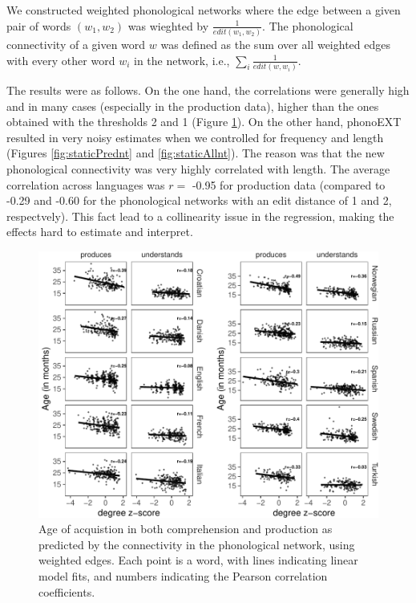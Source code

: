 \documentclass[english,,man,floatsintext]{apa6}
\begin{document}
We constructed weighted phonological networks where the edge between a given pair of words \((w_1, w_2)\) was wieghted by \(\frac{1}{edit(w_1,w_2)}\). The phonological connectivity of a given word \(w\) was defined as the sum over all weighted edges with every other word \(w_i\) in the network, i.e., \(\sum_{i} \frac{1}{edit(w,w_i)}\).

The results were as follows. On the one hand, the correlations were generally high and in many cases (especially in the production data), higher than the ones obtained with the thresholds 2 and 1 (Figure \ref{fig:corrPlotnt}). On the other hand, phonoEXT resulted in very noisy estimates when we controlled for frequency and length (Figures \ref{fig:staticPrednt} and \ref{fig:staticAllnt}). The reason was that the new phonological connectivity was very highly correlated with length. The average correlation across languages was \(r =\) -0.95 for production data (compared to -0.29 and -0.60 for the phonological networks with an edit distance of 1 and 2, respectvely). This fact lead to a collinearity issue in the regression, making the effects hard to estimate and interpret.

\begin{figure}[!h]
\includegraphics[width=\textwidth]{ms_files/figure-latex/corrPlotnt-1} \caption{Age of acquistion in both comprehension and production as predicted by the connectivity in the phonological network, using weighted edges. Each point is a word, with lines indicating linear model fits, and numbers indicating the Pearson correlation coefficients.}\label{fig:corrPlotnt}
\end{figure}
\end{document}
